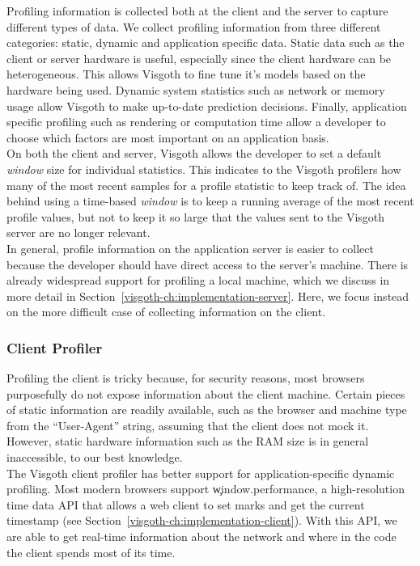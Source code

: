   Profiling information is collected both at the client and the server to
  capture different types of data. We collect profiling information from three
  different categories: static, dynamic and application specific data.  Static
  data such as the client or server hardware is useful, especially since the
  client hardware can be heterogeneous. This allows Visgoth to fine tune it's
  models based on the hardware being used. Dynamic system statistics such as
  network or memory usage allow Visgoth to make up-to-date prediction
  decisions. Finally, application specific profiling such as rendering or
  computation time allow a developer to choose which factors are most important
  on an application basis.\\

  On both the client and server, Visgoth allows the developer to set a default
  \emph{window} size for individual statistics. This indicates to the Visgoth
  profilers how many of the most recent samples for a profile statistic to keep
  track of. The idea behind using a time-based \emph{window} is to keep a
  running average of the most recent profile values, but not to keep it so
  large that the values sent to the Visgoth server are no longer relevant.\\

  In general, profile information on the application server is easier to
  collect because the developer should have direct access to the server's
  machine. There is already widespread support for profiling a local machine,
  which we discuss in more detail in Section~\ref{visgoth-ch:implementation-server}. Here,
  we focus instead on the more difficult case of collecting information on the
  client.\\

  \subsubsection{Client Profiler}

  Profiling the client is tricky because, for security reasons, most browsers
  purposefully do not expose information about the client machine. Certain
  pieces of static information are readily available, such as the browser and
  machine type from the ``User-Agent'' string, assuming that the client does
  not mock it.  However, static hardware information such as the RAM size is in
  general inaccessible, to our best knowledge.\\

  The Visgoth client profiler has better support for application-specific
  dynamic profiling.  Most modern browsers support \c{window.performance}, a
  high-resolution time data API that allows a web client to set marks and get
  the current timestamp (see Section~\ref{visgoth-ch:implementation-client}). With this
  API, we are able to get real-time information about the network and where in
  the code the client spends most of its time.\\

